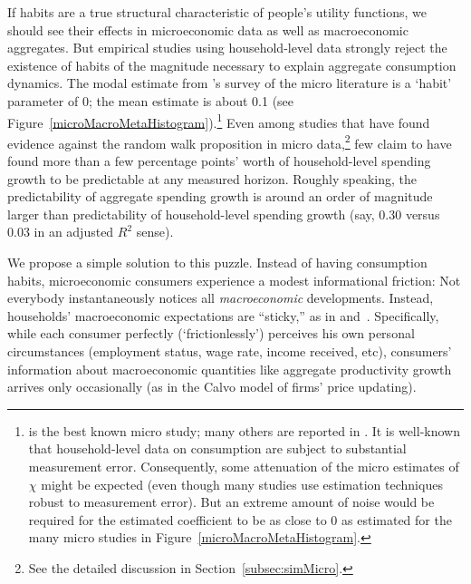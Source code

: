 \documentclass[titlepage]{\econtex}\newcommand{\texname}{cAndCwithStickyE}
\begin{document}
If habits are a true structural characteristic of people's utility functions, we should see their effects in microeconomic data as well as macroeconomic aggregates.  But empirical studies using household-level data strongly reject the existence of habits of the magnitude necessary to explain aggregate consumption dynamics.  The modal estimate from \cite{hrsHabit}'s survey of the micro literature is a `habit' parameter of 0; the mean estimate is about 0.1 (see Figure~\ref{microMacroMetaHistogram}).\footnote{\cite{dynanHabits} is the best known micro study; many others are reported in \cite{hrsHabit}.  It is well-known that household-level data on consumption are subject to substantial measurement error. Consequently, some attenuation of the micro estimates of $\chi$ might be expected (even though many studies use estimation techniques robust to measurement error). But an extreme amount of noise would be required for the estimated coefficient to be as close to 0 as estimated for the many micro studies in Figure~\ref{microMacroMetaHistogram}.  } Even among studies that have found evidence against the random walk proposition in micro data,\footnote{See the detailed discussion in Section~\ref{subsec:simMicro}.} few claim to have found more than a few percentage points' worth of household-level spending growth to be predictable at any measured horizon.  Roughly speaking, the predictability of aggregate spending growth is around an order of magnitude larger than predictability of household-level spending growth (say, 0.30 versus 0.03 in an adjusted ${R}^{2}$ sense).

We propose a simple solution to this puzzle.  Instead of having consumption habits, microeconomic consumers experience a modest informational friction: Not everybody instantaneously notices all \emph{macroeconomic} developments.  Instead, households' macroeconomic expectations are ``sticky,'' as in \cite{mrSlumps} and~\cite{carroll:epidemicinflQJE}.  Specifically, while each consumer perfectly (`frictionlessly') perceives his own personal circumstances (employment status, wage rate, income received, etc), consumers' information about macroeconomic quantities like aggregate productivity growth arrives only occasionally (as in the Calvo model of firms' price updating).
\end{document}
